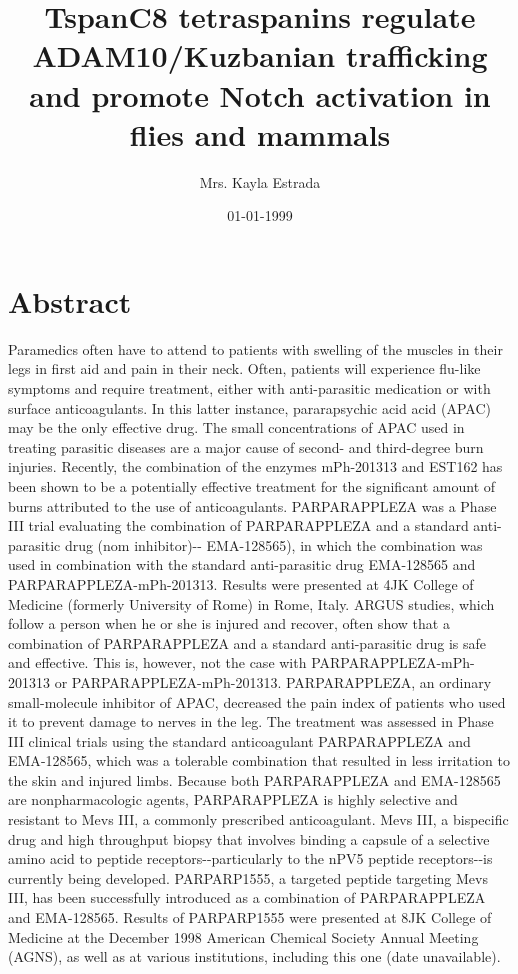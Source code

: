 \documentclass{article}%
\title{TspanC8 tetraspanins regulate ADAM10/Kuzbanian trafficking and promote Notch activation in flies and mammals}%
\author{Mrs. Kayla Estrada}%
\affil{State Key Laboratory for Agrobiotechnology and Key Laboratory of Crop Heterosis and Utilization (MOE), Beijing Key Laboratory of Crop Genetic Improvement, China Agricultural University, Beijing, China, \newline%
    National Plant Gene Research Centre (Beijing), Beijing, China}%
\date{01{-}01{-}1999}%
\begin{document}
%
\normalsize%
\maketitle%
\section{Abstract}%
\label{sec:Abstract}%
Paramedics often have to attend to patients with swelling of the muscles in their legs in first aid and pain in their neck. Often, patients will experience flu{-}like symptoms and require treatment, either with anti{-}parasitic medication or with surface anticoagulants. In this latter instance, pararapsychic acid acid (APAC) may be the only effective drug. The small concentrations of APAC used in treating parasitic diseases are a major cause of second{-} and third{-}degree burn injuries.\newline%
Recently, the combination of the enzymes mPh{-}201313 and EST162 has been shown to be a potentially effective treatment for the significant amount of burns attributed to the use of anticoagulants. PARPARAPPLEZA was a Phase III trial evaluating the combination of PARPARAPPLEZA and a standard anti{-}parasitic drug (nom inhibitor){-}{-} EMA{-}128565), in which the combination was used in combination with the standard anti{-}parasitic drug EMA{-}128565 and PARPARAPPLEZA{-}mPh{-}201313. Results were presented at 4JK College of Medicine (formerly University of Rome) in Rome, Italy. ARGUS studies, which follow a person when he or she is injured and recover, often show that a combination of PARPARAPPLEZA and a standard anti{-}parasitic drug is safe and effective. This is, however, not the case with PARPARAPPLEZA{-}mPh{-}201313 or PARPARAPPLEZA{-}mPh{-}201313.\newline%
PARPARAPPLEZA, an ordinary small{-}molecule inhibitor of APAC, decreased the pain index of patients who used it to prevent damage to nerves in the leg. The treatment was assessed in Phase III clinical trials using the standard anticoagulant PARPARAPPLEZA and EMA{-}128565, which was a tolerable combination that resulted in less irritation to the skin and injured limbs. Because both PARPARAPPLEZA and EMA{-}128565 are nonpharmacologic agents, PARPARAPPLEZA is highly selective and resistant to Mevs III, a commonly prescribed anticoagulant.\newline%
Mevs III, a bispecific drug and high throughput biopsy that involves binding a capsule of a selective amino acid to peptide receptors{-}{-}particularly to the nPV5 peptide receptors{-}{-}is currently being developed. PARPARP1555, a targeted peptide targeting Mevs III, has been successfully introduced as a combination of PARPARAPPLEZA and EMA{-}128565. Results of PARPARP1555 were presented at 8JK College of Medicine at the December 1998 American Chemical Society Annual Meeting (AGNS), as well as at various institutions, including this one (date unavailable).
\end{document}
